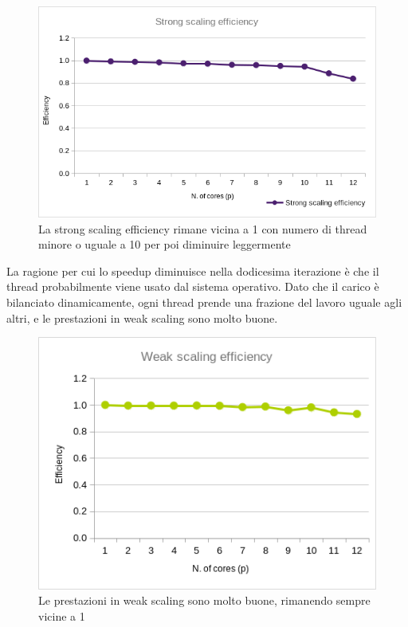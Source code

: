 \documentclass[a4paper,11pt, twoside]{report}
\begin{document}
\begin{figure}[H]
    \includegraphics[scale=0.5]{images/omp_strong.png}
    \caption[]{La strong scaling efficiency rimane vicina a 1 con numero di thread minore o uguale a 10 per poi diminuire leggermente}
\end{figure}
La ragione per cui lo speedup diminuisce nella dodicesima iterazione è che il thread probabilmente viene usato dal sistema operativo.
Dato che il carico è bilanciato dinamicamente, ogni thread prende una frazione del lavoro uguale agli altri,
e le prestazioni in weak scaling sono molto buone.
\begin{figure}[H]
    \includegraphics[scale=0.5]{images/omp_weak.png}
    \caption[]{Le prestazioni in weak scaling sono molto buone, rimanendo sempre vicine a 1}
\end{figure}
\end{document}
